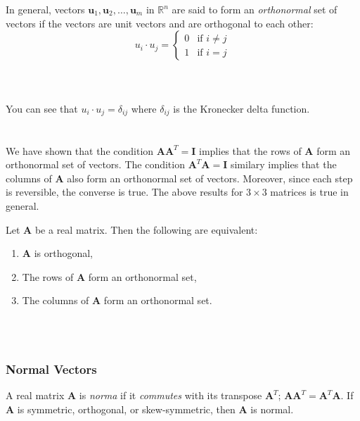 \documentclass[../setup.tex]{subfiles}
\begin{document}
In general, vectors $\bm{u}_1, \bm{u}_2, \dots,  \bm{u}_m$ in $\mathbb{R}^n$ are said to form an \textit{orthonormal} set of vectors if the vectors are unit vectors and are orthogonal to each other:
\[u_i \cdot u_j = \begin{cases}0 & \text{if } i \neq j \\ 1 & \text{if } i = j\end{cases}\] \\
\phantom \\ \\
You can see that $u_i \cdot u_j = \delta_{ij}$ where $\delta_{ij}$ is the Kronecker delta function. \\
\phantom \\ \\
We have shown that the condition $\bm{A}\bm{A}^T = \bm{I}$ implies that the rows of $\bm{A}$ form an orthonormal set of vectors. The condition $\bm{A}^T\bm{A} = \bm{I}$ similary implies that the columns of $\bm{A}$ also form an orthonormal set of vectors. Moreover, since each step is reversible, the converse is true. The above results for $3 \times 3$ matrices is true in general. \\
\begin{theorem}
Let $\bm{A}$ be a real matrix. Then the following are equivalent:
\begin{enumerate}
	\item $\bm{A}$ is orthogonal,
	\item The rows of $\bm{A}$ form an orthonormal set,
	\item The columns of $\bm{A}$ form an orthonormal set.
\end{enumerate}
\end{theorem}
\phantom \\ \\


\subsubsection{Normal Vectors}
A real matrix $\bm{A}$ is \textit{norma} if it \textit{commutes} with its transpose $\bm{A}^T$; $\bm{A}\bm{A}^T = \bm{A}^T\bm{A}$. If $\bm{A}$ is symmetric, orthogonal, or skew-symmetric, then $\bm{A}$ is normal. \\
\phantom \\ \\
\end{document}
